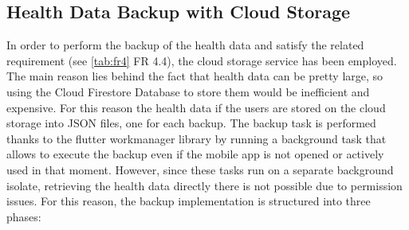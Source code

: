 \subsection{Health Data Backup with Cloud Storage}
\label{subsec:backup}
In order to perform the backup of the health data and satisfy the related requirement (see \cref{tab:fr4} FR 4.4), the cloud storage service has been employed. The main reason lies behind the fact that health data can be pretty large, so using the Cloud Firestore Database to store them would be inefficient and expensive. For this reason the health data if the users are stored on the cloud storage into JSON files, one for each backup. The backup task is performed thanks to the flutter workmanager library by running a background task that allows to execute the backup even if the mobile app is not opened or actively used in that moment. However, since these tasks run on a separate background isolate, retrieving the health data directly there is not possible due to permission issues.
\noindent For this reason, the backup implementation is structured into three phases:
